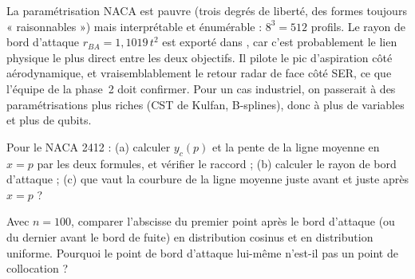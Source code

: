 \begin{projet}
La paramétrisation NACA est pauvre (trois degrés de liberté, des formes toujours « raisonnables ») mais interprétable et énumérable : $8^3=512$ profils. Le rayon de bord d'attaque $r_{BA}=1{,}1019\,t^2$ est exporté dans , car c'est probablement le lien physique le plus direct entre les deux objectifs. Il pilote le pic d'aspiration côté aérodynamique, et vraisemblablement le retour radar de face côté SER, ce que l'équipe de la phase~2 doit confirmer. Pour un cas industriel, on passerait à des paramétrisations plus riches (CST de Kulfan, B-splines), donc à plus de variables et plus de qubits.
\end{projet}

\exercices
\begin{exercice}
Pour le NACA 2412 : (a) calculer $y_c(p)$ et la pente de la ligne moyenne en $x=p$ par les deux formules, et vérifier le raccord ; (b) calculer le rayon de bord d'attaque ; (c) que vaut la courbure de la ligne moyenne juste avant et juste après $x=p$ ?
\end{exercice}
\begin{exercice}
Avec $n=100$, comparer l'abscisse du premier point après le bord d'attaque (ou du dernier avant le bord de fuite) en distribution cosinus et en distribution uniforme. Pourquoi le point de bord d'attaque lui-même n'est-il pas un point de collocation ?
\end{exercice}
